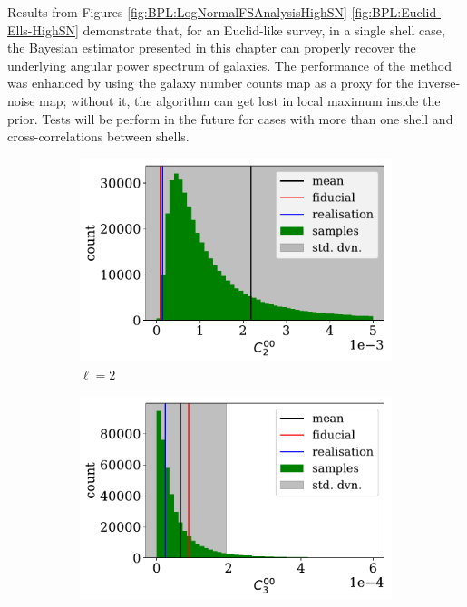 \qquad Results from Figures \ref{fig:BPL:LogNormalFSAnalysisHighSN}-\ref{fig:BPL:Euclid-Ells-HighSN} demonstrate that, for an Euclid-like survey, in a single shell case, the Bayesian estimator presented in this chapter can properly recover the underlying angular power spectrum of galaxies. The performance of the method was enhanced by using the galaxy number counts map as a proxy for the inverse-noise map; without it, the algorithm can get lost in local maximum inside the prior. Tests will be perform in the future for cases with more than one shell and cross-correlations between shells.

\begin{figure}
\begin{subfigure}{.5\textwidth}
  \centering
  \includegraphics[width=\textwidth]{BPL-FIGS/Euclid-LN-PNoi-N32-HDens_HISTOGRAM-ell-02.pdf}
  \caption{$\ell = 2$}
\end{subfigure}
\begin{subfigure}{.5\textwidth}
  \centering
  \includegraphics[width=\textwidth]{BPL-FIGS/Euclid-LN-PNoi-N32-HDens_HISTOGRAM-ell-03.pdf}

\end{subfigure}
\end{figure}
